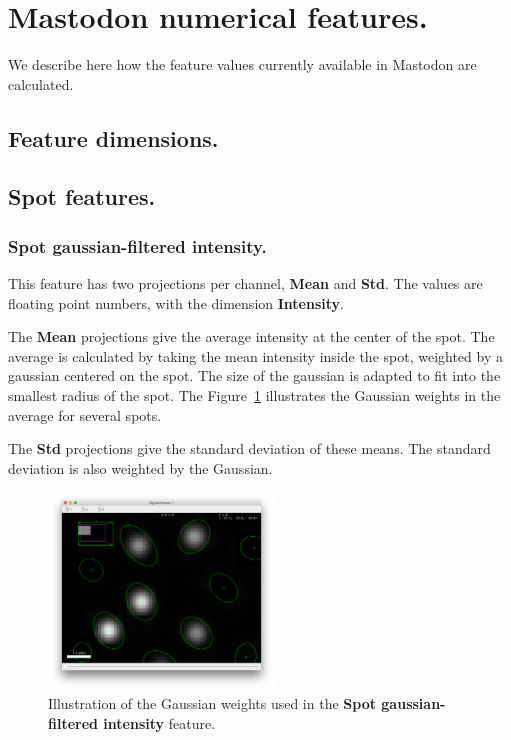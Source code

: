\section{Mastodon numerical features.}
\label{FeaturesExplanation}

We describe here how the feature values currently available in Mastodon are calculated. 

\subsection{Feature dimensions.}


\subsection{Spot features.}

\subsubsection{Spot gaussian-filtered intensity.}

This feature has two projections per channel, \textbf{Mean} and \textbf{Std}.
The values are floating point numbers, with the dimension \textbf{Intensity}.

The \textbf{Mean} projections give the average intensity at the center of the spot.
The average is calculated by taking the mean intensity inside the spot, weighted by a gaussian centered on the spot.
The size of the gaussian is adapted to fit into the smallest radius of the spot.
The Figure~\ref{fig:SpotGaussWeights} illustrates the Gaussian weights in the average for several spots.

The \textbf{Std} projections give the standard deviation of these means. 
The standard deviation is also weighted by the Gaussian.

\begin{figure}
    \centering
    \includegraphics[width=6cm]{figures/Mastodon_GaussMeanIntensityWeights.png}
    \caption{Illustration of the Gaussian weights used in the \textbf{Spot gaussian-filtered intensity} feature.}
    \label{fig:SpotGaussWeights}
\end{figure}
    

